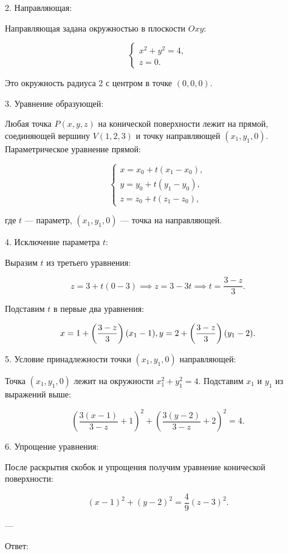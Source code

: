 \documentclass[a4paper,14pt]{extreport} %
\begin{document}
2.  Направляющая: 

   Направляющая задана окружностью в плоскости \( Oxy \):

   \[
   \begin{cases}
   x^2 + y^2 = 4, \\
   z = 0.
   \end{cases}
   \]

   Это окружность радиуса 2 с центром в точке \( (0, 0, 0) \).

3.  Уравнение образующей: 

   Любая точка \( P(x, y, z) \) на конической поверхности лежит на прямой, соединяющей вершину \( V(1, 2, 3) \) и точку направляющей \( (x_1, y_1, 0) \). Параметрическое уравнение прямой:

   \[
   \begin{cases}
   x = x_0 + t(x_1 - x_0), \\
   y = y_0 + t(y_1 - y_0), \\
   z = z_0 + t(z_1 - z_0),
   \end{cases}
   \]

   где \( t \) — параметр, \( (x_1, y_1, 0) \) — точка на направляющей.

4.  Исключение параметра \( t \): 

   Выразим \( t \) из третьего уравнения:

   \[
   z = 3 + t(0 - 3) \implies z = 3 - 3t \implies t = \frac{3 - z}{3}.
   \]

   Подставим \( t \) в первые два уравнения:

   \[
   x = 1 + \left(\frac{3 - z}{3}\right)(x_1 - 1), \\
   y = 2 + \left(\frac{3 - z}{3}\right)(y_1 - 2).
   \]

5.  Условие принадлежности точки \( (x_1, y_1, 0) \) направляющей: 

   Точка \( (x_1, y_1, 0) \) лежит на окружности \( x_1^2 + y_1^2 = 4 \). Подставим \( x_1 \) и \( y_1 \) из выражений выше:

   \[
   \left(\frac{3(x - 1)}{3 - z} + 1\right)^2 + \left(\frac{3(y - 2)}{3 - z} + 2\right)^2 = 4.
   \]

6.  Упрощение уравнения: 

   После раскрытия скобок и упрощения получим уравнение конической поверхности:

   \[
   (x - 1)^2 + (y - 2)^2 = \frac{4}{9}(z - 3)^2.
   \]

---

 Ответ: 
\end{document}
